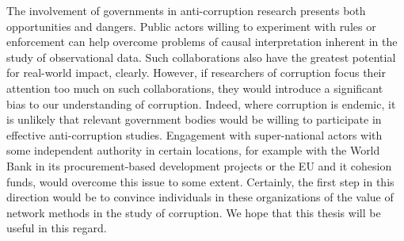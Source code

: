 The involvement of governments in anti-corruption research presents both opportunities and dangers. Public actors willing to experiment with rules or enforcement can help overcome problems of causal interpretation inherent in the study of observational data. Such collaborations also have the greatest potential for real-world impact, clearly. However, if researchers of corruption focus their attention too much on such collaborations, they would introduce a significant bias to our understanding of corruption. Indeed, where corruption is endemic, it is unlikely that relevant government bodies would be willing to participate in effective anti-corruption studies. Engagement with super-national actors with some independent authority in certain locations, for example with the World Bank in its procurement-based development projects or the EU and it cohesion funds, would overcome this issue to some extent. Certainly, the first step in this direction would be to convince individuals in these organizations of the value of network methods in the study of corruption. We hope that this thesis will be useful in this regard. 

